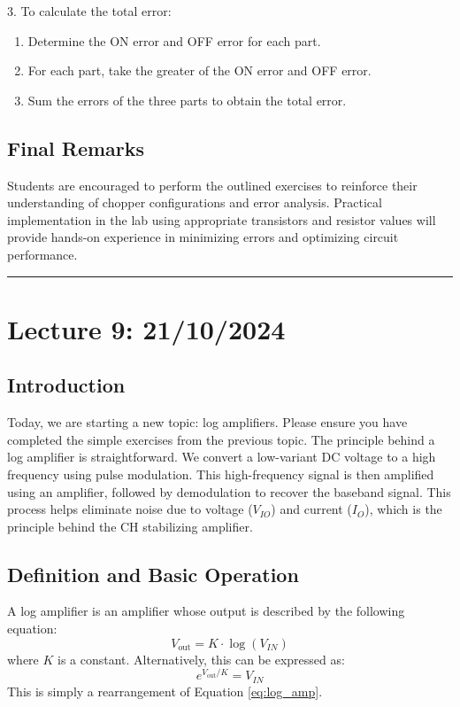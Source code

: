 \documentclass[a4paper,9pt,twoside,openany,twocolumn]{memoir}
\begin{document}
\begin{enumerate}
\begin{tcolorbox}
    3. To calculate the total error:
    \begin{enumerate}[leftmargin=3mm, itemsep=0mm]
        \item Determine the ON error and OFF error for each part.
        \item For each part, take the greater of the ON error and OFF error.
        \item Sum the errors of the three parts to obtain the total error.
    \end{enumerate}
\end{tcolorbox}


   
\end{enumerate}

\subsection{Final Remarks}
Students are encouraged to perform the outlined exercises to reinforce their understanding of chopper configurations and error analysis. Practical implementation in the lab using appropriate transistors and resistor values will provide hands-on experience in minimizing errors and optimizing circuit performance.
\begin{center}\rule{0.5\linewidth}{0.5pt}\end{center}

\section*{Lecture 9: 21/10/2024}

\subsection{Introduction}
Today, we are starting a new topic: log amplifiers. Please ensure you have completed the simple exercises from the previous topic. The principle behind a log amplifier is straightforward. We convert a low-variant DC voltage to a high frequency using pulse modulation. This high-frequency signal is then amplified using an amplifier, followed by demodulation to recover the baseband signal. This process helps eliminate noise due to voltage (\(V_{IO}\)) and current (\(I_{O}\)), which is the principle behind the CH stabilizing amplifier.

\subsection{Definition and Basic Operation}
A log amplifier is an amplifier whose output is described by the following equation:
\begin{equation}
V_{\text{out}} = K \cdot \log(V_{IN})
\label{eq:log_amp}
\end{equation}
where \(K\) is a constant. Alternatively, this can be expressed as:
\begin{equation}
e^{V_{\text{out}}/K} = V_{IN}
\label{eq:log_amp_rearranged}
\end{equation}
This is simply a rearrangement of Equation \ref{eq:log_amp}.
\end{document}
